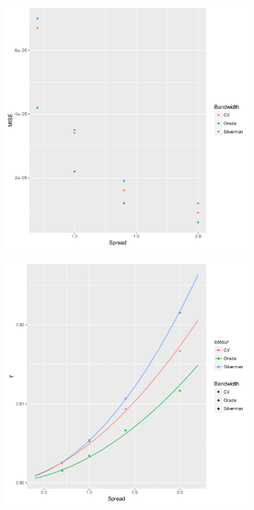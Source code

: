 \begin{figure}[htbp]
    \centering
    \begin{subfigure}[b]{0.3\textwidth}
        \includegraphics[width=\textwidth]{results/by_cases_spread/MISE-vs-risk-spread}
        \caption{}
        \label{fig:ise:unif_100_SD:mise}
    \end{subfigure}
    \begin{subfigure}[b]{0.3\textwidth}
        \includegraphics[width=\textwidth]{results/by_cases_spread/RMISE-vs-risk-spread}

\end{subfigure}
\end{figure}
